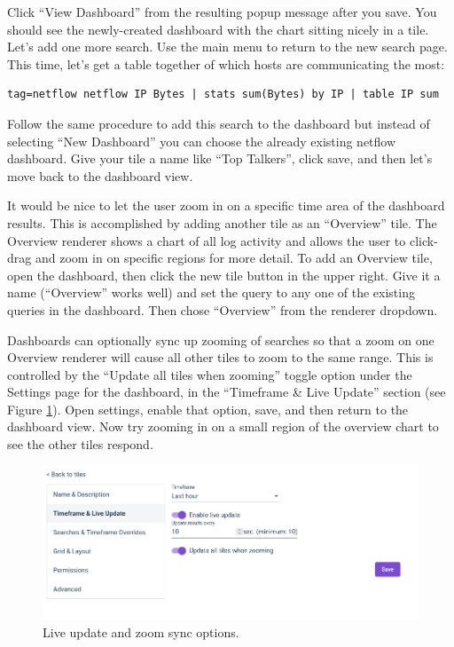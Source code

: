 Click ``View Dashboard'' from the resulting popup message after you
save. You should see the newly-created dashboard with the chart sitting nicely in a
tile. Let's add one more search. Use the main menu to return to the new search page.
This time, let's get a table together of which hosts are communicating the most:

\begin{Verbatim}[breaklines=true]
tag=netflow netflow IP Bytes | stats sum(Bytes) by IP | table IP sum
\end{Verbatim}

Follow the same procedure to add this search to the dashboard but
instead of selecting ``New Dashboard'' you can choose the already
existing netflow dashboard. Give your tile a name like ``Top Talkers'',
click save, and then let's move back to the dashboard view.

It would be nice to let the user zoom in on a specific time area of
the dashboard results. This is accomplished by adding another tile as an
``Overview'' tile. The Overview renderer shows a chart of all log activity
and allows the user to click-drag and zoom in on specific regions for
more detail. To add an Overview tile, open the dashboard, then click
the new tile button in the upper right.  Give it a name (``Overview''
works well) and set the query to any one of the existing queries in the
dashboard. Then chose ``Overview'' from the renderer dropdown.

Dashboards can optionally sync up zooming of searches so that a zoom
on one Overview renderer will cause all other tiles to zoom to the same
range. This is controlled by the ``Update all tiles when zooming'' toggle
option under the Settings page for the dashboard, in the ``Timeframe \&
Live Update'' section (see Figure \ref{fig:dashboard-settings}). Open settings, enable that option, save, and
then return to the dashboard view. Now try zooming in on a small region
of the overview chart to see the other tiles respond.

\begin{figure}
	\includegraphics[width=0.7\linewidth]{images/dashboard-settings.png}
	\caption{Live update and zoom sync options.}
	\label{fig:dashboard-settings}
\end{figure}

